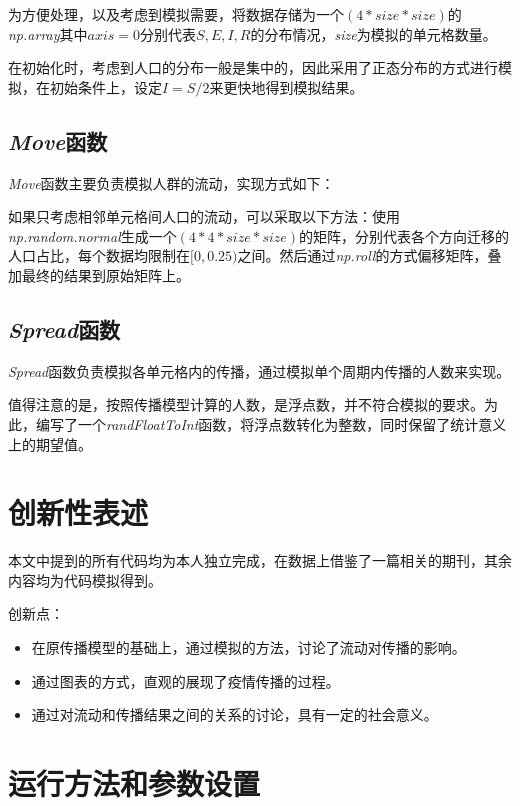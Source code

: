 \documentclass[a4paper]{ltxdoc}
\begin{document}
为方便处理，以及考虑到模拟需要，将数据存储为一个$(4*size*size)$的\textit{np.array}其中$axis=0$分别代表$S,E,I,R$的分布情况，\textit{size}为模拟的单元格数量。

在初始化时，考虑到人口的分布一般是集中的，因此采用了正态分布的方式进行模拟，在初始条件上，设定$I = S/2$来更快地得到模拟结果。

\subsection{\textit{Move}函数}

\textit{Move}函数主要负责模拟人群的流动，实现方式如下：\par

如果只考虑相邻单元格间人口的流动，可以采取以下方法：使用\textit{np.random.normal}生成一个$(4*4*size*size)$的矩阵，分别代表各个方向迁移的人口占比，每个数据均限制在$[0,0.25)$之间。然后通过\textit{np.roll}的方式偏移矩阵，叠加最终的结果到原始矩阵上。

\subsection{\textit{Spread}函数}

\textit{Spread}函数负责模拟各单元格内的传播，通过模拟单个周期内传播的人数来实现。

值得注意的是，按照传播模型计算的人数，是浮点数，并不符合模拟的要求。为此，编写了一个\textit{randFloatToInt}函数，将浮点数转化为整数，同时保留了统计意义上的期望值。

\section{创新性表述}

本文中提到的所有代码均为本人独立完成，在数据上借鉴了一篇相关的期刊，其余内容均为代码模拟得到。

\bigskip


创新点：

\begin{itemize}
    \item 在原传播模型的基础上，通过模拟的方法，讨论了流动对传播的影响。
    \item 通过图表的方式，直观的展现了疫情传播的过程。
    \item 通过对流动和传播结果之间的关系的讨论，具有一定的社会意义。
\end{itemize}

\section{运行方法和参数设置}
\end{document}
